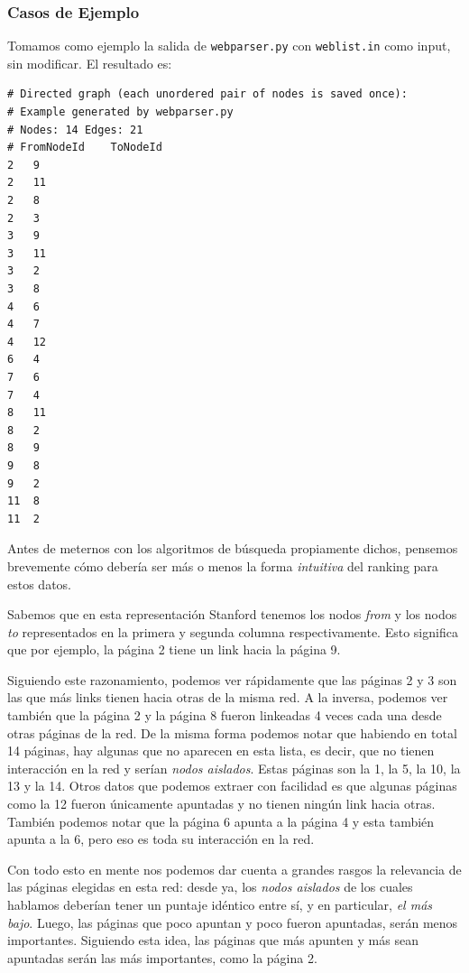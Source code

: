 \subsubsection{Casos de Ejemplo}

Tomamos como ejemplo la salida de \texttt{webparser.py} con \texttt{weblist.in} como input, sin modificar. El resultado es: 

\begin{verbatim}
# Directed graph (each unordered pair of nodes is saved once):
# Example generated by webparser.py
# Nodes: 14 Edges: 21 
# FromNodeId	ToNodeId
2	9
2	11
2	8
2	3
3	9
3	11
3	2
3	8
4	6
4	7
4	12
6	4
7	6
7	4
8	11
8	2
8	9
9	8
9	2
11	8
11	2
\end{verbatim}

Antes de meternos con los algoritmos de búsqueda propiamente dichos, pensemos brevemente cómo debería ser más o menos la forma \textit{intuitiva} del ranking para estos datos.

Sabemos que en esta representación Stanford tenemos los nodos \textit{from} y los nodos \textit{to} representados en la primera y segunda columna respectivamente. Esto significa que por ejemplo, la página 2 tiene un link hacia la página 9.

Siguiendo este razonamiento, podemos ver rápidamente que las páginas 2 y 3 son las que más links tienen hacia otras de la misma red. A la inversa, podemos ver también que la página 2 y la página 8 fueron linkeadas 4 veces cada una desde otras páginas de la red. De la misma forma podemos notar que habiendo en total 14 páginas, hay algunas que no aparecen en esta lista, es decir, que no tienen interacción en la red y serían \textit{nodos aislados}. Estas páginas son la 1, la 5, la 10, la 13 y la 14. Otros datos que podemos extraer con facilidad es que algunas páginas como la 12 fueron únicamente apuntadas y no tienen ningún link hacia otras. También podemos notar que la página 6 apunta a la página 4 y esta también apunta a la 6, pero eso es toda su interacción en la red.

Con todo esto en mente nos podemos dar cuenta a grandes rasgos la relevancia de las páginas elegidas en esta red: desde ya, los \textit{nodos aislados} de los cuales hablamos deberían tener un puntaje idéntico entre sí, y en particular, \textit{el más bajo}. Luego, las páginas que poco apuntan y poco fueron apuntadas, serán menos importantes. Siguiendo esta idea, las páginas que más apunten y más sean apuntadas serán las más importantes, como la página 2. 

